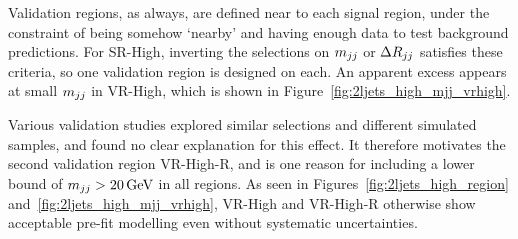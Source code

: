 Validation regions, as always, are defined near to each signal region, under
the constraint of being somehow `nearby' and having enough data to test
background predictions.
For SR-High, inverting the selections on $\mjj$ or $\rjj$ satisfies
these criteria, so one validation region is designed on each.
An apparent excess appears at small $\mjj$ in VR-High, which is shown in
Figure~\ref{fig:2ljets_high_mjj_vrhigh}.

Various validation studies explored similar selections and different
simulated samples, and found no clear explanation for this effect.
It therefore motivates the second validation region VR-High-R, and is one
reason for including a lower bound of $\mjj > 20\,\eV[G]$ in all regions.
As seen in Figures~\ref{fig:2ljets_high_region}
and~\ref{fig:2ljets_high_mjj_vrhigh}, VR-High and VR-High-R otherwise show
acceptable pre-fit modelling even without systematic uncertainties.

